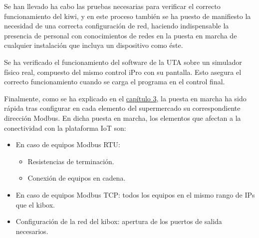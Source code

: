 
Se han llevado ha cabo las pruebas necesarias para verificar el correcto funcionamiento del kiwi, y en este proceso también se ha puesto de manifiesto la necesidad de una correcta configuración de red, haciendo indispensable la presencia de personal con conocimientos de redes en la puesta en marcha de cualquier instalación que incluya un dispositivo como éste.

Se ha verificado el funcionamiento del software de la UTA sobre un simulador físico real, compuesto del mismo control iPro con su pantalla. Esto asegura el correcto funcionamiento cuando se carga el programa en el control final.

Finalmente, como se ha explicado en el \hyperref[sec:altaInstalacion]{capítulo 3}, la puesta en marcha ha sido rápida tras configurar en cada elemento del supermercado su correspondiente dirección Modbus. En dicha puesta en marcha, los elementos que afectan a la conectividad con la plataforma IoT son:

\begin{itemize}
    \item En caso de equipos Modbus RTU: 
    \begin{itemize}
        \item Resistencias de terminación.
        \item Conexión de equipos en cadena.
    \end{itemize}
    \item En caso de equipos Modbus TCP: todos los equipos en el mismo rango de IPs que el kibox.
    \item Configuración de la red del kibox: apertura de los puertos de salida necesarios.
\end{itemize}





